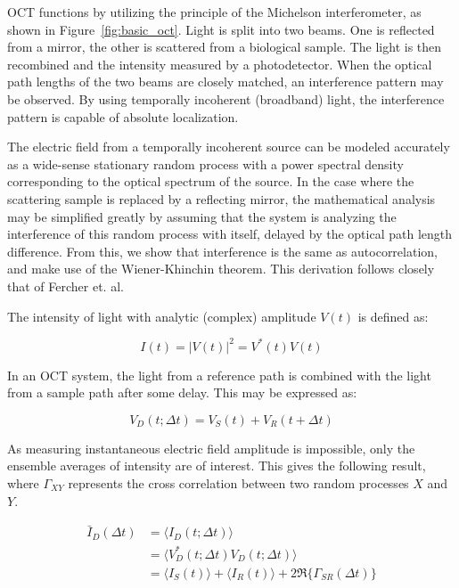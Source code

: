 OCT functions by utilizing the principle of the Michelson interferometer, as shown in Figure~\ref{fig:basic_oct}. Light is split into two beams. One is reflected from a mirror, the other is scattered from a biological sample. The light is then recombined and the intensity measured by a photodetector. When the optical path lengths of the two beams are closely matched, an interference pattern may be observed. By using temporally incoherent (broadband) light, the interference pattern is capable of absolute localization.

The electric field from a temporally incoherent source can be modeled accurately as a wide-sense stationary random process with a power spectral density corresponding to the optical spectrum of the source. \cite{Bouma} In the case where the scattering sample is replaced by a reflecting mirror, the mathematical analysis may be simplified greatly by assuming that the system is analyzing the interference of this random process with itself, delayed by the optical path length difference. From this, we show that interference is the same as autocorrelation, and make use of the Wiener-Khinchin theorem. This derivation follows closely that of Fercher et. al. \cite{fercher}

The intensity of light with analytic (complex) amplitude $V(t)$ is defined as:

\begin{equation}
I(t) = |V(t)|^2 = V^*(t)V(t)
\end{equation}

In an OCT system, the light from a reference path is combined with the light from a sample path after some delay. This may be expressed as:

\begin{equation}
V_D(t; \Delta t) = V_S(t) + V_R(t + \Delta t)
\end{equation}

As measuring instantaneous electric field amplitude is impossible, only the ensemble averages of intensity are of interest. This gives the following result, where $\Gamma_{XY}$ represents the cross correlation between two random processes $X$ and $Y$.

\begin{equation}
\begin{aligned}
\bar{I}_D(\Delta t) & =  \langle I_D(t; \Delta t) \rangle \\
& =  \langle V^*_D(t; \Delta t) V_D(t; \Delta t) \rangle \\
& =  \langle I_S(t) \rangle + \langle I_R(t) \rangle + 2 \Re \{\Gamma_{SR} (\Delta t) \}
\end{aligned}
\end{equation}

